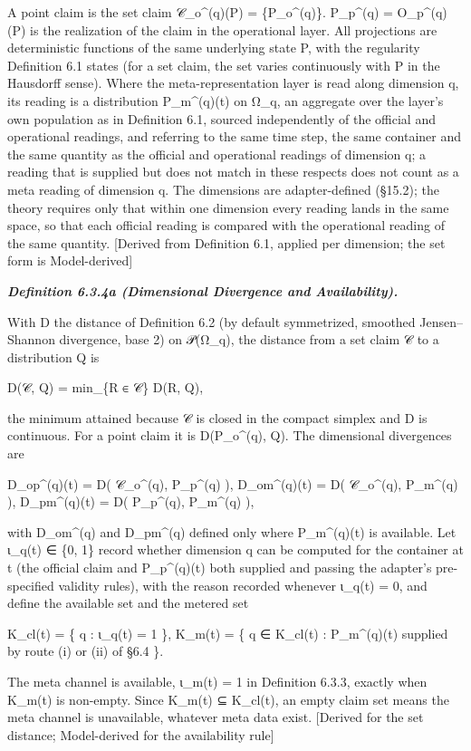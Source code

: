 \documentclass[
]{article}
\begin{document}
A point claim is the set claim 𝒞\_o\^{}(q)(P) = \{P\_o\^{}(q)\}.
P\_p\^{}(q) = O\_p\^{}(q)(P) is the realization of the claim in the
operational layer. All projections are deterministic functions of the
same underlying state P, with the regularity Definition 6.1 states (for
a set claim, the set varies continuously with P in the Hausdorff sense).
Where the meta-representation layer is read along dimension q, its
reading is a distribution P\_m\^{}(q)(t) on Ω\_q, an aggregate over the
layer's own population as in Definition 6.1, sourced independently of
the official and operational readings, and referring to the same time
step, the same container and the same quantity as the official and
operational readings of dimension q; a reading that is supplied but does
not match in these respects does not count as a meta reading of
dimension q. The dimensions are adapter-defined (§15.2); the theory
requires only that within one dimension every reading lands in the same
space, so that each official reading is compared with the operational
reading of the same quantity. {[}Derived from Definition 6.1, applied
per dimension; the set form is Model-derived{]}

\emph{\textbf{Definition 6.3.4a (Dimensional Divergence and
Availability).}}

With D the distance of Definition 6.2 (by default symmetrized, smoothed
Jensen--Shannon divergence, base 2) on 𝒫(Ω\_q), the distance from a set
claim 𝒞 to a distribution Q is

D(𝒞, Q) = min\_\{R ∈ 𝒞\} D(R, Q),

the minimum attained because 𝒞 is closed in the compact simplex and D is
continuous. For a point claim it is D(P\_o\^{}(q), Q). The dimensional
divergences are

D\_op\^{}(q)(t) = D( 𝒞\_o\^{}(q), P\_p\^{}(q) ), D\_om\^{}(q)(t) = D(
𝒞\_o\^{}(q), P\_m\^{}(q) ), D\_pm\^{}(q)(t) = D( P\_p\^{}(q),
P\_m\^{}(q) ),

with D\_om\^{}(q) and D\_pm\^{}(q) defined only where P\_m\^{}(q)(t) is
available. Let ι\_q(t) ∈ \{0, 1\} record whether dimension q can be
computed for the container at t (the official claim and P\_p\^{}(q)(t)
both supplied and passing the adapter's pre-specified validity rules),
with the reason recorded whenever ι\_q(t) = 0, and define the available
set and the metered set

K\_cl(t) = \{ q : ι\_q(t) = 1 \}, K\_m(t) = \{ q ∈ K\_cl(t) :
P\_m\^{}(q)(t) supplied by route (i) or (ii) of §6.4 \}.

The meta channel is available, ι\_m(t) = 1 in Definition 6.3.3, exactly
when K\_m(t) is non-empty. Since K\_m(t) ⊆ K\_cl(t), an empty claim set
means the meta channel is unavailable, whatever meta data exist.
{[}Derived for the set distance; Model-derived for the availability
rule{]}
\end{document}
